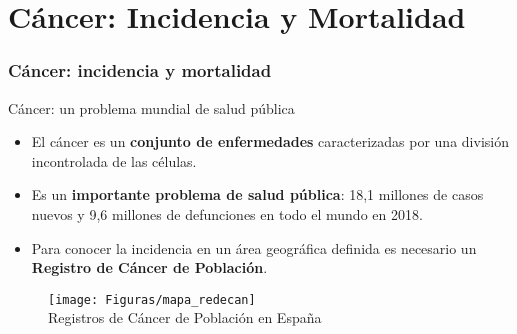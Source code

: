 \documentclass{beamer}
\begin{document}
\section{Cáncer: Incidencia y Mortalidad}
\begin{frame}\frametitle{Cáncer: incidencia y mortalidad}

	\begin{block}{Cáncer: un problema mundial de salud pública} 
		\begin{itemize}
			\item El cáncer es un \textbf{conjunto de enfermedades} caracterizadas por una división incontrolada de las células. \\[2ex] 
			\item Es un \textbf{importante problema de salud pública}: 18,1 millones de casos nuevos y 9,6 millones de defunciones en todo el mundo en 2018. \\[2ex]
			\item Para conocer la incidencia en un área geográfica definida es necesario un \textbf{Registro de Cáncer de Población}. 
		\end{itemize}
	\end{block}

	\begin{figure}
		\centering
		\texttt{[image: Figuras/mapa\_redecan]}\\
		\tiny Registros de Cáncer de Población en España
	\end{figure}

\end{frame}

\end{document}
